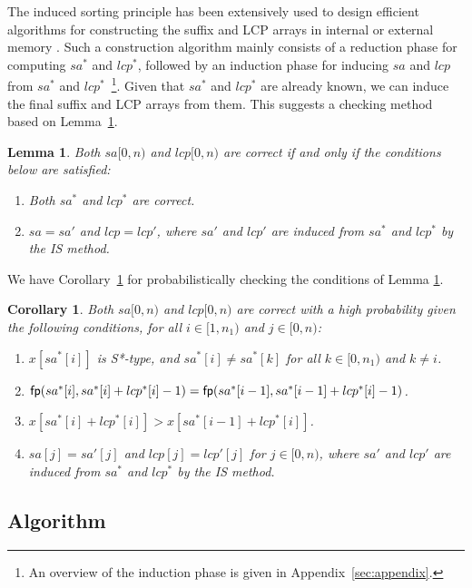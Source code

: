 \documentclass[10pt,journal,compsoc]{IEEEtran}
\newtheorem{Lemma}{Lemma}
\newtheorem{Corollary}{Corollary}
\begin{document}
The induced sorting principle has been extensively used to design efficient algorithms for constructing the suffix and LCP arrays in internal or external memory {\color{blue} \cite{sais,dsais,emsads,esais,inducelcp}}. Such a construction algorithm mainly consists of a reduction phase for computing $sa^*$ and $lcp^*$, followed by an induction phase for inducing $sa$ and $lcp$ from $sa^*$ and $lcp^*$~\footnote{An overview of the induction phase is given in Appendix~\ref{sec:appendix}.}. Given that $sa^*$ and $lcp^*$ are already known, we can induce the final suffix and LCP arrays from them. This suggests a checking method based on Lemma~\ref{lemma:2}. 
	
\begin{Lemma} \label{lemma:2}
Both $sa[0, n)$ and $lcp[0, n)$ are correct if and only if the conditions below are satisfied:

\begin{enumerate}[(1)]
	\item
	Both $sa^*$ and $lcp^*$ are correct.
	\item
	$sa = sa'$ and $lcp = lcp'$, where $sa'$ and $lcp'$ are induced from $sa^*$ and $lcp^*$ by the IS method.
\end{enumerate}
\end{Lemma}

We have Corollary~\ref{corollary:2} for probabilistically checking the conditions of Lemma \ref{lemma:2}.

\begin{Corollary} \label{corollary:2}
Both $sa[0, n)$ and $lcp[0, n)$ are correct with a high probability given the following conditions, for all $i \in [1, n_1)$ and $j \in [0, n)$:
\begin{enumerate}[(1)]
	\item
	$x[sa^*[i]]$ is S*-type, and $sa^*[i] \ne sa^*[k]$ for all $k \in [0, n_1)$ and $k \ne i$.
	\item
	${\sf fp}(sa^*[i], sa^*[i] + lcp^*[i] - 1) = {\sf fp}(sa^*[i - 1], sa^*[i - 1] + lcp^*[i] - 1)$.
	\item
	$x[sa^*[i] + lcp^*[i]] > x[sa^*[i - 1] + lcp^*[i]]$.
	\item
	$sa[j] = sa'[j]$ and $lcp[j] = lcp'[j]$ for $j \in [0, n)$, where $sa'$ and $lcp'$ are induced from $sa^*$ and $lcp^*$ by the IS method.
\end{enumerate}
\end{Corollary}



\subsection{Algorithm} \label{sec:method2:algorithm}
\end{document}
